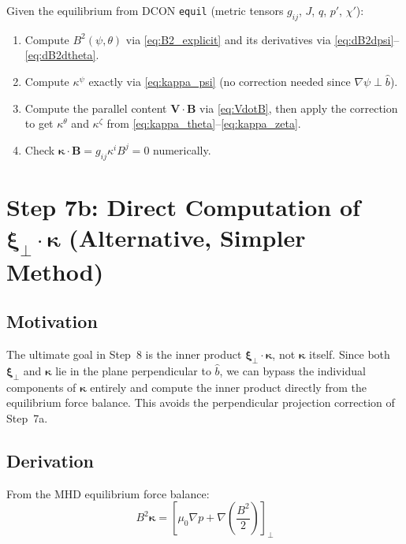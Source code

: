 \documentclass[12pt,a4paper]{article}
\newcommand{\bxi}{\boldsymbol{\xi}}
\begin{document}
\begin{tcolorbox}[colback=red!5!white, colframe=red!60!black, title=\textbf{Summary: Computing $\bm{\kappa}$ in practice (Method 7a)}]
Given the equilibrium from DCON \texttt{equil} (metric tensors $g_{ij}$, $J$, $q$, $p'$, $\chi'$):
\begin{enumerate}
    \item Compute $B^2(\psi,\theta)$ via \eqref{eq:B2_explicit} and its derivatives via \eqref{eq:dB2dpsi}--\eqref{eq:dB2dtheta}.
    \item Compute $\kappa^\psi$ exactly via \eqref{eq:kappa_psi} (no correction needed since $\nabla\psi\perp\hat{b}$).
    \item Compute the parallel content $\mathbf{V}\cdot\mathbf{B}$ via \eqref{eq:VdotB}, then apply the correction to get $\kappa^\theta$ and $\kappa^\zeta$ from \eqref{eq:kappa_theta}--\eqref{eq:kappa_zeta}.
    \item Check $\bm{\kappa}\cdot\mathbf{B} = g_{ij}\kappa^i B^j = 0$ numerically.
\end{enumerate}
\end{tcolorbox}

\section{Step 7b: Direct Computation of $\bxi_\perp\cdot\bm{\kappa}$ (Alternative, Simpler Method)}

\subsection{Motivation}

The ultimate goal in Step~8 is the inner product $\bxi_\perp\cdot\bm{\kappa}$, not $\bm{\kappa}$ itself. Since both $\bxi_\perp$ and $\bm{\kappa}$ lie in the plane perpendicular to $\hat{b}$, we can bypass the individual components of $\bm{\kappa}$ entirely and compute the inner product directly from the equilibrium force balance. This avoids the perpendicular projection correction of Step~7a.

\subsection{Derivation}

From the MHD equilibrium force balance:
\begin{equation}
    B^2\bm{\kappa} = \left[\mu_0\nabla p + \nabla\!\left(\frac{B^2}{2}\right)\right]_\perp
\end{equation}
\end{document}
